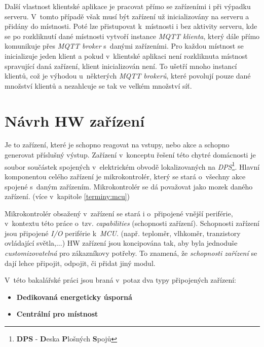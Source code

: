 Další vlastnost klientské aplikace je pracovat přímo se zařízeními i při výpadku serveru.
V~tomto případě však musí být zařízení už inicializovány na serveru a přidány do místnosti.
Poté lze přistupovat k~místnosti i bez aktivity serveru, kde se po rozkliknutí dané místnosti vytvoří instance \emph{MQTT klienta}, který dále přímo komunikuje přes \emph{MQTT broker} s~danými zařízeními.
Pro každou místnost se inicializuje jeden klient a pokud v~klientské aplikaci není rozkliknuta místnost spravující daná zařízení, klient inicializován není.
To ušetří mnoho instancí klientů, což je výhodou u~některých \emph{MQTT brokerů}, které povolují pouze dané množství klientů a nezahlcuje se tak ve velkém množství síť.

\section{Návrh HW zařízení}
\label{navrh:hardware}

Je to zařízení, které je schopno reagovat na vstupy, nebo akce a schopno generovat příslušný výstup.
Zařízení v~konceptu řešení této chytré domácnosti je soubor součástek spojených v~elektrickém obvodě lokalizovaných na \emph{DPS}\footnote{\textbf{DPS} - \textbf{D}eska \textbf{P}lošných \textbf{S}pojů}.
Hlavní komponentou celého zařízení je mikrokontrolér, který se stará o~všechny akce spojené s~daným zařízením.
Mikrokontrolér se dá považovat jako mozek daného zařízení. (více v~kapitole \ref{terminy:mcu})

Mikrokontrolér obsažený v~zařízení se stará i o~připojené vnější periférie, v~kontextu této práce o~tzv. \emph{capabilities} (schopnosti zařízení).
Schopnosti zařízení jsou připojené \emph{I/O} periférie k~\emph{MCU}. (např. teploměr, vlhkoměr, tranzistory ovládající světla,...)
HW zařízení jsou koncipována tak, aby byla jednoduše \emph{customizovatelná} pro zákazníkovy potřeby.
To znamená, že \emph{schopnosti zařízení} se dají lehce připojit, odpojit, či přidat jiný modul.
\newline

V~této bakalářské práci jsou braná v~potaz dva typy připojených zařízení:
\begin{itemize}
  \item \textbf{Dedikovaná energeticky úsporná}
  \item \textbf{Centrální pro místnost}
\end{itemize}

